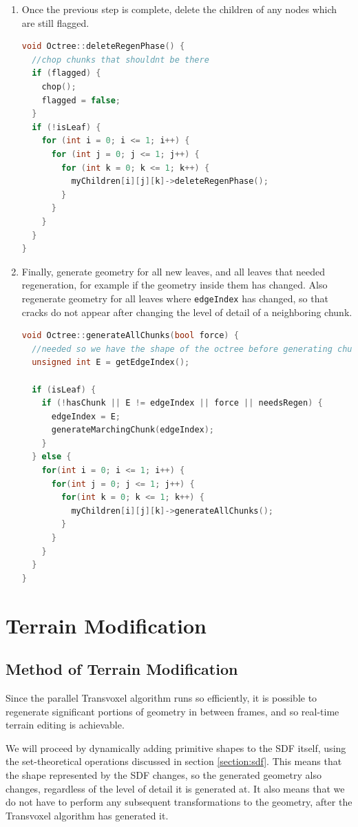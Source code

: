 \documentclass[11pt]{article}
\begin{document}
\begin{enumerate}
  \item Once the previous step is complete, delete the children of any nodes which are still flagged. 
  
  \begin{lstlisting}[language=C++,label={deleteregenphase},caption={The third stage in the octree refinement process.}]
void Octree::deleteRegenPhase() {
  //chop chunks that shouldnt be there
  if (flagged) {
    chop();
    flagged = false;
  }
  if (!isLeaf) {
    for (int i = 0; i <= 1; i++) {
      for (int j = 0; j <= 1; j++) {
        for (int k = 0; k <= 1; k++) {
          myChildren[i][j][k]->deleteRegenPhase();
        }
      }
    }
  }  
}
  \end{lstlisting}
  \item Finally, generate geometry for all new leaves, and all leaves that needed regeneration, for example if the geometry inside them has changed. Also regenerate geometry for all leaves where \texttt{edgeIndex} has changed, so that cracks do not appear after changing the level of detail of a neighboring chunk.
  \begin{lstlisting}[language=C++,label={generateallchunks},caption={The fourth stage in the octree refinement process.}]
void Octree::generateAllChunks(bool force) {
  //needed so we have the shape of the octree before generating chunks that rely on it
  unsigned int E = getEdgeIndex();

  if (isLeaf) {
    if (!hasChunk || E != edgeIndex || force || needsRegen) {
      edgeIndex = E;
      generateMarchingChunk(edgeIndex);
    }
  } else {
    for(int i = 0; i <= 1; i++) {
      for(int j = 0; j <= 1; j++) {
        for(int k = 0; k <= 1; k++) {
          myChildren[i][j][k]->generateAllChunks();
        }
      }
    }
  }
}
  \end{lstlisting}
\end{enumerate}

\section{Terrain Modification}
\subsection{Method of Terrain Modification}
Since the parallel Transvoxel algorithm runs so efficiently, it is possible to regenerate significant portions of geometry in between frames, and so real-time terrain editing is achievable. 

We will proceed by dynamically adding primitive shapes to the SDF itself, using the set-theoretical operations discussed in section \ref{section:sdf}. This means that the shape represented by the SDF changes, so the generated geometry also changes, regardless of the level of detail it is generated at. It also means that we do not have to perform any subsequent transformations to the geometry, after the Transvoxel algorithm has generated it.
\end{document}

